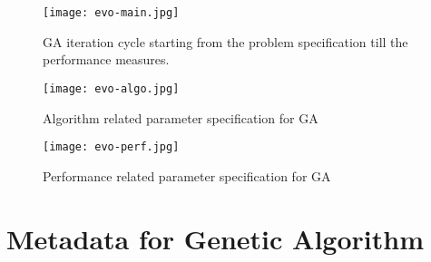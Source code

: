 \documentclass[preprint,12pt]{elsarticle}
\begin{document}
\begin{figure}[thpb]
\centering
\texttt{[image: evo-main.jpg]}
\caption{GA iteration cycle starting from the problem specification till the performance measures.}
\label{fig:GAParameters}
\end{figure}

\begin{figure}[thpb]
\centering
\texttt{[image: evo-algo.jpg]}
\caption{Algorithm related parameter specification for GA}
\label{fig:detailed-metadatainfo}
\end{figure}

\begin{figure}[bth]
\centering
\texttt{[image: evo-perf.jpg]}
\caption{Performance related parameter specification for GA}
\label{fig:detailed-metadataperf}
\end{figure}



\section{Metadata for Genetic Algorithm} \label{sec:GA-Metadata}
\end{document}
